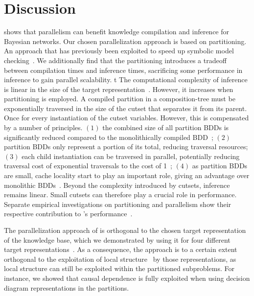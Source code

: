 
\section{Discussion}
\label{sec:conclusion}

\toolname shows that parallelism can benefit knowledge compilation and inference for Bayesian networks. Our chosen parallelization approach is based on partitioning. An approach that has previously been exploited to speed up symbolic model checking~\cite{sylvan-journal,narayan1996partitioned,sahoo2004partitioning}.  We additionally find that the partitioning introduces a tradeoff between compilation times and inference times, sacrificing some performance in inference to gain parallel scalability.
t
The computational complexity of inference is linear in the size of the target representation~\cite{darwiche2002knowledge}. However, it increases when partitioning is employed. A compiled partition in a composition-tree must be exponentially traversed in the size of the cutset that separates it from its parent. Once for every instantiation of the cutset variables. However, this is compensated by a number of principles. $(1)$ the combined size of all partition BDDs is significantly reduced compared to the monolithically compiled BDD~\cite{dal2017reducing}; $(2)$ partition BDDs only represent a portion of its total, reducing traversal resources; $(3)$ each child instantiation can be traversed in parallel, potentially reducing traversal cost of exponential traversals to the cost of 1~\cite{dal2021compositional}; $(4)$ as partition BDDs are small, cache locality start to play an important role, giving an advantage over monolithic BDDs~\cite{dal2018parallel}. Beyond the complexity introduced by cutsets, inference remains linear. Small cutsets can therefore play a crucial role in performance. Separate empirical investigations on partitioning and parallelism show their respective contribution to \toolname's performance~\cite{dal2018parallel,dal2021compositional}.



The parallelization approach of \toolname is orthogonal to the chosen target representation of the knowledge base, which we demonstrated by using it for four different target representations~\cite{dal2018parallel}. As a consequence, the approach is to a certain extent orthogonal to the exploitation of local structure~\cite{shih2019compiling} by those representations, as local structure can still be exploited within the partitioned subproblems. For instance, we showed that causal dependence is fully exploited when using decision diagram representations in the partitions.

